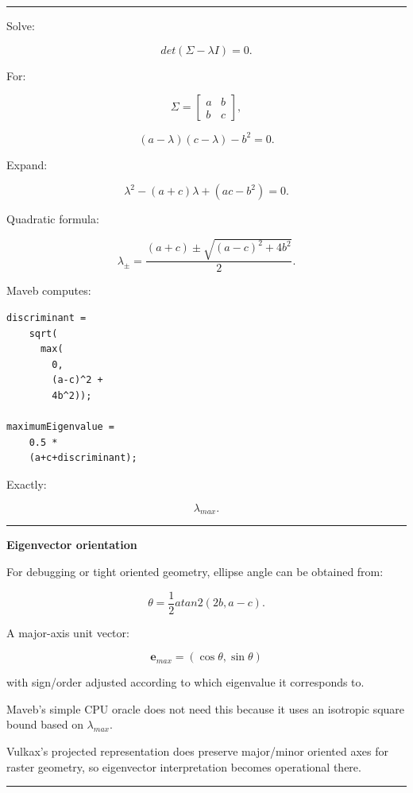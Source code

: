 \begin{center}\rule{0.5\linewidth}{0.5pt}\end{center}

Solve:

\[
det(
\Sigma-\lambda I
)
=0.
\]

For:

\[
\Sigma=
\begin{bmatrix}
a&b\\
b&c
\end{bmatrix},
\]

\[
(a-\lambda)
(c-\lambda)
-b^2=0.
\]

Expand:

\[
\lambda^2
-
(a+c)\lambda
+
(ac-b^2)
=0.
\]

Quadratic formula:

\[
\boxed{
\lambda_{\pm}
=
\frac{
(a+c)
\pm
\sqrt{
(a-c)^2+4b^2
}
}{2}.
}
\]

Maveb computes:

\begin{verbatim}
discriminant =
    sqrt(
      max(
        0,
        (a-c)^2 +
        4b^2));

maximumEigenvalue =
    0.5 *
    (a+c+discriminant);
\end{verbatim}

Exactly:

\[
\lambda_{max}.
\]

\begin{center}\rule{0.5\linewidth}{0.5pt}\end{center}

\textbf{Eigenvector orientation}

For debugging or tight oriented geometry, ellipse angle can be obtained from:

\[
\boxed{
\theta=
\frac12
atan2(
2b,
a-c
).
}
\]

A major-axis unit vector:

\[
\mathbf e_{max}
=
(\cos\theta,\sin\theta)
\]

with sign/order adjusted according to which eigenvalue it corresponds to.

Maveb's simple CPU oracle does not need this because it uses an isotropic square bound based on \(\lambda_{max}\).

Vulkax's projected representation does preserve major/minor oriented axes for raster geometry, so eigenvector interpretation becomes operational there.

\begin{center}\rule{0.5\linewidth}{0.5pt}\end{center}


